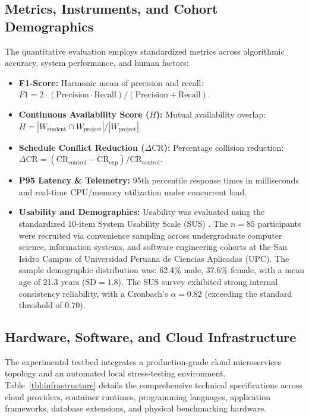 \documentclass[a4paper,fleqn]{cas-dc}
\begin{document}
\subsection{Metrics, Instruments, and Cohort Demographics}
The quantitative evaluation employs standardized metrics across algorithmic accuracy, system performance, and human factors:
\begin{itemize}
    \item \textbf{F1-Score:} Harmonic mean of precision and recall: $F1 = 2 \cdot (\text{Precision} \cdot \text{Recall}) / (\text{Precision} + \text{Recall})$.
    \item \textbf{Continuous Availability Score ($H$):} Mutual availability overlap: $H = |W_{\text{student}} \cap W_{\text{project}}| / |W_{\text{project}}|$.
    \item \textbf{Schedule Conflict Reduction ($\Delta\text{CR}$):} Percentage collision reduction: $\Delta\text{CR} = (\text{CR}_{\text{control}} - \text{CR}_{\text{exp}}) / \text{CR}_{\text{control}}$.
    \item \textbf{P95 Latency \& Telemetry:} 95th percentile response times in milliseconds and real-time CPU/memory utilization under concurrent load.
    \item \textbf{Usability and Demographics:} Usability was evaluated using the standardized 10-item System Usability Scale (SUS) \cite{bangor2008, brooke1996}. The $n = 85$ participants were recruited via convenience sampling across undergraduate computer science, information systems, and software engineering cohorts at the San Isidro Campus of Universidad Peruana de Ciencias Aplicadas (UPC). The sample demographic distribution was: 62.4\% male, 37.6\% female, with a mean age of 21.3 years ($\text{SD} = 1.8$). The SUS survey exhibited strong internal consistency reliability, with a Cronbach's $\alpha = 0.82$ (exceeding the standard threshold of 0.70).
\end{itemize}

\subsection{Hardware, Software, and Cloud Infrastructure}
The experimental testbed integrates a production-grade cloud microservices topology and an automated local stress-testing environment. Table~\ref{tbl:infrastructure} details the comprehensive technical specifications across cloud providers, container runtimes, programming languages, application frameworks, database extensions, and physical benchmarking hardware.
\end{document}
